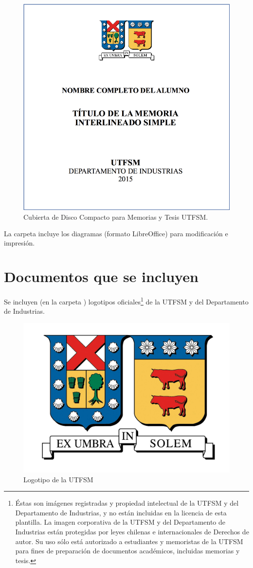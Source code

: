 \begin{figure}[ht!]
\centering
\includegraphics[width=.4\textwidth]{figures/thesis_cd_cover.png}
\caption{Cubierta de Disco Compacto para Memorias y Tesis UTFSM.}
\label{fig:thesis_cd_cover}
\end{figure}


La carpeta  incluye los diagramas (formato LibreOffice) para modificación e impresión.

\section{Documentos que se incluyen}

Se incluyen (en la carpeta ) logotipos oficiales\footnote{Éstas son imágenes registradas y propiedad intelectual de la UTFSM y del Departamento de Industrias, y no están incluidas en la licencia de esta plantilla. La imagen corporativa de la UTFSM y del Departamento de Industrias están protegidas por leyes chilenas e internacionales de Derechos de autor. Su uso sólo está autorizado a estudiantes y memoristas de la UTFSM para fines de preparación de documentos académicos, incluidas memorias y tesis.}
de la UTFSM y del Departamento de Industrias.

\begin{figure}[ht!]
\centering
\includegraphics[scale = .5]{figures/logousm.png}
\caption{Logotipo de la UTFSM}
\label{fig:logousm}
\end{figure}

